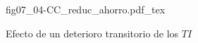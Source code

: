 \begin{figure}[h]
\centering
\def\svgwidth{0.5\textwidth}
{fig07_04-CC_reduc_ahorro.pdf_tex}
\caption{Efecto de un deterioro transitorio de los $TI$}
\label{fig07_04-CC_reduc_ahorro}
\end{figure}